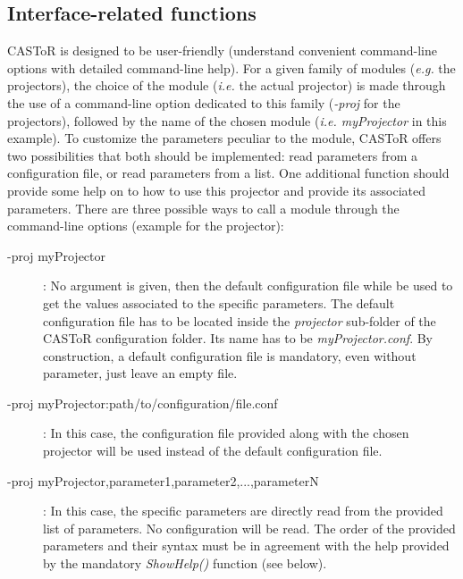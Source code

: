 \documentclass[a4paper, 11pt]{article}
\begin{document}
\subsection{Interface-related functions}

CASToR is designed to be user-friendly (understand convenient command-line options with detailed command-line help).
For a given family of modules (\textit{e.g.} the projectors), the choice of the module (\textit{i.e.} the actual projector) is made through the use of a command-line option dedicated to this family (\textit{-proj} for the projectors), followed by the name of the chosen module (\textit{i.e. myProjector} in this example).
To customize the parameters peculiar to the module, CASToR offers two possibilities that both should be implemented: read parameters from a configuration file, or read parameters from a list.
One additional function should provide some help on to how to use this projector and provide its associated parameters.
There are three possible ways to call a module through the command-line options (example for the projector):

\begin{description}
  \item [-proj myProjector]: No argument is given, then the default configuration file while be used to get the values associated to the specific parameters. The
                             default configuration file has to be located inside the \textit{projector} sub-folder of the CASToR configuration folder. Its name
                             has to be \textit{myProjector.conf}. By construction, a default configuration file is mandatory, even without parameter, just leave
                             an empty file.
  \item [-proj myProjector:path/to/configuration/file.conf]: In this case, the configuration file provided along with the chosen projector will be used instead of
                                                             the default configuration file.
  \item [-proj myProjector,parameter1,parameter2,...,parameterN]: In this case, the specific parameters are directly read from the provided list of parameters. No
                                                                  configuration will be read. The order of the provided parameters and their syntax must be in
                                                                  agreement with the help provided by the mandatory \textit{ShowHelp()} function (see below).
\end{description}
\end{document}
